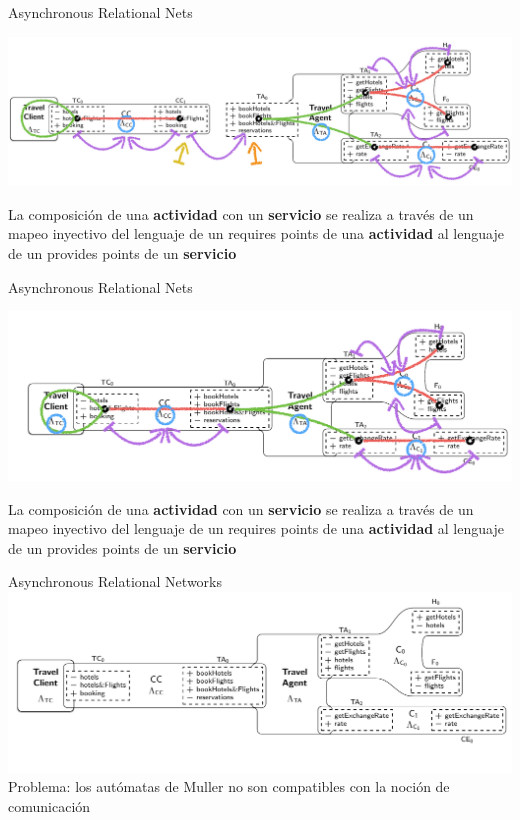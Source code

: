 \documentclass[10pt,xcolor={table,dvipsnames},t]{beamer}
\begin{document}
\begin{frame}{Asynchronous Relational Nets \cite{fiadeiro:fase2011}}
\begin{center}
\includegraphics[scale=0.39]{images/ARN7.png}
\end{center}
La composición de una \textbf{actividad} con un \textbf{servicio} se realiza a través de un \textcolor{map}{mapeo inyectivo} del lenguaje de un \textcolor{req}{requires points} de una \textbf{actividad} al lenguaje de un \textcolor{prov}{provides points} de un \textbf{servicio}
\end{frame}

\begin{frame}{Asynchronous Relational Nets \cite{fiadeiro:fase2011}}
\begin{center}
\includegraphics[scale=0.39]{images/ARN8.png}
\end{center}
La composición de una \textbf{actividad} con un \textbf{servicio} se realiza a través de un \textcolor{map}{mapeo inyectivo} del lenguaje de un \textcolor{req}{requires points} de una \textbf{actividad} al lenguaje de un \textcolor{prov}{provides points} de un \textbf{servicio}
\end{frame}


\begin{frame}{Asynchronous Relational Networks}
   \includegraphics[scale=0.45]{images/ARN9.png}
Problema: los autómatas de Muller no son compatibles con la noción de comunicación
\end{frame}
\end{document}
